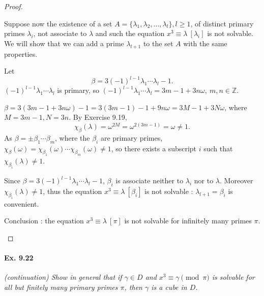 \documentclass[11pt,a4paper]{article}
\newcommand{\Z}{\mathbb{Z}}
\begin{document}
\begin{proof}
\begin{enumerate}
Suppose now the existence of a set $A = \{\lambda_1,\lambda_2,\ldots,\lambda_l\}, l \geq 1$, of distinct primary primes $\lambda_i$, not associate to $\lambda$ and such the equation $x^3 \equiv \lambda\ [\lambda_i]$ is not solvable. We will show that we can add a prime $\lambda_{l+1}$  to the set $A$ with the same properties.

Let $$\beta = 3(-1)^{l-1} \lambda_1\cdots\lambda_l - 1.$$
$(-1)^{l-1} \lambda_1\cdots\lambda_l$ is primary, so $(-1)^{l-1} \lambda_1\cdots\lambda_l = 3m-1 + 3n\omega,\ m,n \in \Z$.

$\beta = 3(3m-1 + 3n\omega) - 1 = 3(3m-1) - 1 + 9n\omega = 3M-1 + 3 N \omega$, where $M = 3m-1, N = 3n$. By Exercise 9.19,
$$\chi_\beta(\lambda) = \omega^{2M} = \omega^{2(3m-1)} = \omega \neq 1.$$
As $\beta = \pm \beta_1\cdots\beta_m$, where the $\beta_i$ are primary primes, $\chi_\beta(\omega) = \chi_{\beta_1}(\omega) \cdots \chi_{\beta_m}(\omega) \neq 1$, so there exists a subscript $i$ such that $\chi_{\beta_i}(\lambda) \ne 1$. 

Since $\beta = 3(-1)^{l-1} \lambda_1\cdots\lambda_l - 1$, $\beta_i$ is associate neither to $\lambda_i$ nor to $\lambda$. Moreover $\chi_{\beta_i}(\lambda)\ne 1$, thus the equation $x^3 \equiv \lambda\ [\beta_i]$ is not solvable : $\lambda_{l+1} = \beta_i$ is convenient.

Conclusion : the equation $x^3 \equiv \lambda \ [\pi]$ is not solvable for infinitely many primes $\pi$.

\end{enumerate}
\end{proof}

\paragraph{Ex. 9.22}

{\it (continuation) Show in general that if $\gamma \in D$ and $x^3 \equiv \gamma \pmod \pi$ is solvable for all but finitely many primary primes $\pi$, then $\gamma$ is a cube in $D$.
}
\end{document}
